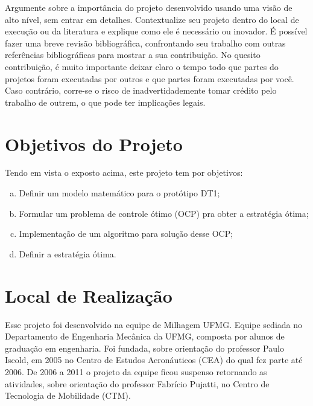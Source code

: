 Argumente sobre a importância do projeto desenvolvido usando uma visão de alto nível, sem entrar em detalhes. Contextualize seu projeto dentro do
local de execução ou da literatura e explique como ele é necessário ou inovador. É possível fazer uma breve revisão bibliográfica, confrontando seu
trabalho com outras referências bibliográficas para mostrar a sua contribuição. No quesito contribuição, é muito importante deixar claro o tempo todo
que partes do projetos foram executadas por outros e que partes foram executadas por você. Caso contrário, corre-se o risco de inadvertidademente
tomar crédito pelo trabalho de outrem, o que pode ter implicações legais.

\section{Objetivos do Projeto}
\label{sec:objetivos}

Tendo em vista o exposto acima, este projeto tem por objetivos:

\begin{enumerate}[a)]
    \item Definir um modelo matemático para o protótipo DT1;
    \item Formular um problema de controle ótimo (OCP) pra obter a estratégia ótima;
    \item Implementação de um algoritmo para solução desse OCP;
    \item Definir a estratégia ótima.
\end{enumerate}

\section{Local de Realização}
\label{sec:empresa}

Esse projeto foi desenvolvido na equipe de Milhagem UFMG. Equipe sediada no Departamento de Engenharia Mecânica da UFMG, composta por alunos de graduação em engenharia.
Foi fundada, sobre orientação do
professor Paulo Iscold, em 2005 no Centro de Estudos Aeronáuticos (CEA) do qual fez
parte até 2006.
De 2006 a 2011 o projeto da equipe ficou suspenso retornando as atividades, sobre orientação do professor Fabrício Pujatti, no Centro de Tecnologia
de Mobilidade (CTM).

